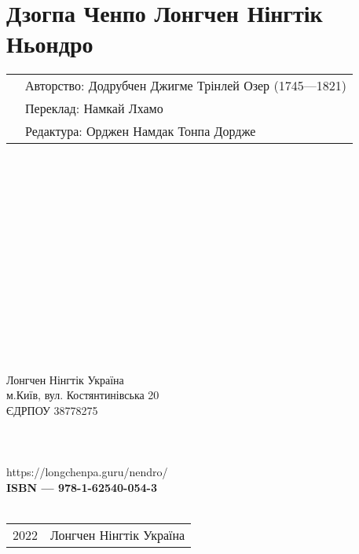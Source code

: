 \section*{Дзогпа Ченпо Лонгчен Нінгтік Ньондро}

\begin{tabular}{ll}
& Авторство: Додрубчен Джигме Трінлей Озер (1745—1821)\\
& Переклад: Намкай Лхамо\\
& Редактура: Орджен Намдак Тонпа Дордже\\
\end{tabular}
\\
\\
\\
\\
\\
\\
\\
\\
\\
\\
\\
\\
\\
\\
Лонгчен Нінгтік Україна \\
м.Київ, вул. Костянтинівська 20 \\
ЄДРПОУ 38778275 \\
\\
\\
\\
https://longchenpa.guru/nendro/ \\

{\bf  ISBN — 978-1-62540-054-3 \hspace{2em}} \\ \\

\begin{tabular}{ll}
\textcopyright{} 2022 & Лонгчен Нінгтік Україна
\end{tabular}
